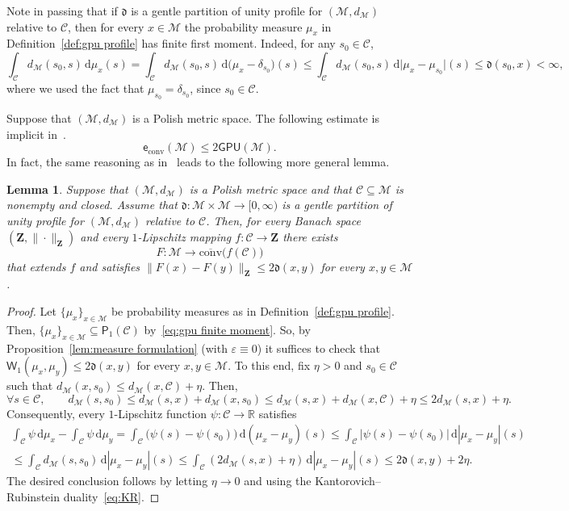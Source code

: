 \documentclass[11pt,reqno]{amsart}
\renewcommand{\le}{\leqslant}
\newcommand{\ud}[0]{\,\mathrm{d}}
\renewcommand{\d}{\delta}
\newcommand{\e}{\varepsilon}
\newcommand{\R}{\mathbb R}
\newtheorem{lemma}[theorem]{Lemma}
\theoremstyle{remark}
\newcommand{\MM}{\mathcal{M}}
\renewcommand{\subset}{\subseteq}
\newcommand{\W}{\mathsf{W}}
\newcommand{\ee}{\mathsf{e}}
\newcommand{\bfZ}{\mathbf{Z}}
\newcommand{\sub}{\mathscr{C}}
\renewcommand{\1}{\mathbf 1}
\newcommand{\conv}{\mathrm{conv}}
\newcommand{\gpu}{\mathsf{GPU}}
\begin{document}
Note in passing that if $\mathfrak{d}$ is a gentle partition of unity profile for $(\MM,d_\MM)$ relative to $\sub$, then  for every $x\in \MM$ the probability measure $\mu_x$ in Definition~\ref{def:gpu profile} has finite first moment. Indeed, for any $s_0\in \sub$,
\begin{equation}\label{eq:gpu finite moment}
\int_{\sub}d_{\MM}(s_0,s)\ud\mu_x(s)=\int_{\sub}d_{\MM}(s_0,s)\ud\big(\mu_x-\d_{s_0}\big)(s)\le \int_{\sub}d_{\MM}(s_0,s)\ud\big|\mu_x-\mu_{s_0}\big|(s)\le \mathfrak{d}(s_0,x)<\infty,
\end{equation}
where we used the fact that $\mu_{s_0}=\d_{s_0}$, since $s_0\in \sub$.




Suppose that $(\MM,d_{\MM})$ is a Polish metric space. The following estimate is implicit in~\cite{LN05}.
\begin{equation}\label{eq:e to gpu}
\ee_{\conv}(\MM)\le 2\gpu(\MM).
\end{equation}
In fact, the same reasoning as in~\cite{LN05} leads to the following more general lemma.
\begin{lemma}\label{lem:GPU to ext} Suppose that $(\MM,d_{\MM})$ is a Polish metric space and that $\sub\subset \MM$ is nonempty and closed. Assume that $\mathfrak{d}:\MM\times \MM\to [0,\infty)$ is a gentle partition of unity profile for $(\MM,d_\MM)$ relative to $\sub$. Then, for every Banach space $(\bfZ,\|\cdot\|_\bfZ)$ and every $1$-Lipschitz mapping $f:\sub \to \bfZ$ there exists
$$
F:\MM\to \overline{\conv}\big(f(\sub)\big)
$$
that extends $f$ and satisfies $\|F(x)-F(y)\|_\bfZ\le 2\mathfrak{d}(x,y)$ for every $x,y\in \MM$.
\end{lemma}


\begin{proof} Let $\{\mu_x\}_{x\in \MM}$ be probability measures as in Definition~\ref{def:gpu profile}. Then, $\{\mu_x\}_{x\in \MM}\subset \mathsf{P}_1(\sub)$ by~\eqref{eq:gpu finite moment}. So, by Proposition~\ref{lem:measure formulation}  (with $\e\equiv 0$) it suffices to check that $\W_1(\mu_x,\mu_y)\le 2\mathfrak{d}(x,y)$ for every $x,y\in \MM$. To this end, fix $\eta>0$ and $s_0\in \sub$ such that $d_\MM(x,s_0)\le d_\MM(x,\sub)+\eta$. Then,
$$
\forall s\in \sub, \qquad d_\MM(s,s_0)\le d_\MM(s,x)+d_\MM(x,s_0)\le d_\MM(s,x)+ d_\MM(x,\sub)+\eta\le 2d_\MM(s,x)+\eta.
$$
Consequently, every $1$-Lipschitz function $\psi:\sub \to \R$ satisfies
\begin{multline*}
\int_\sub \psi \ud\mu_x-\int_\sub\psi\ud\mu_y=\int_\sub \big(\psi(s)-\psi(s_0)\big)\ud (\mu_x-\mu_y)(s)\le \int_\sub |\psi(s)-\psi(s_0)|\ud |\mu_x-\mu_y|(s)\\\le \int_\sub d_\MM(s,s_0)\ud |\mu_x-\mu_y|(s)\le \int_\sub (2d_\MM(s,x)+\eta)\ud |\mu_x-\mu_y|(s)\le 2\mathfrak{d}(x,y)+2\eta.
\end{multline*}
The desired conclusion follows by letting $\eta\to 0$ and using the Kantorovich--Rubinstein duality~\eqref{eq:KR}.
\end{proof}
\end{document}

